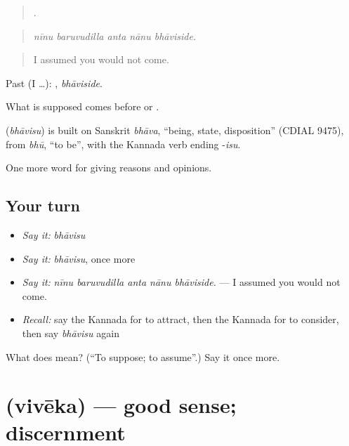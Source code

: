 \begin{quote}
    .
\end{quote}

\begin{quote}
\emph{nīnu baruvudilla anta nānu bhāviside.}
\end{quote}

\begin{quote}
I assumed you would not come.
\end{quote}

Past (I …): , \emph{bhāviside}.

What is supposed comes before  or .

\begin{cousinweb}
\textbf{} (\emph{bhāvisu}) is built on Sanskrit \emph{bhāva}, \textquotedblleft{}being, state, disposition\textquotedblright{} (CDIAL 9475), from \emph{bhū}, \textquotedblleft{}to be\textquotedblright{}, with the Kannada verb ending -\emph{isu}.
\end{cousinweb}

\begin{grammarlens}[title={What you've built}]
One more word for giving reasons and opinions.
\end{grammarlens}

\subsection*{Your turn}
\begin{itemize}
\raggedright
  \item \emph{Say it:} \emph{bhāvisu}
  \item \emph{Say it:} \emph{bhāvisu}, once more
  \item \emph{Say it:} \emph{nīnu baruvudilla anta nānu bhāviside.} — I assumed you would not come.
  \item \emph{Recall:} say the Kannada for to attract, then the Kannada for to consider, then say \emph{bhāvisu} again
\end{itemize}

\begin{tcolorbox}[breakable,colback=teal!4,colframe=teal!35!black,title={Before you move on}]
What does  mean? (\textquotedblleft{}To suppose; to assume\textquotedblright{}.) Say it once more.
\end{tcolorbox}
\section[\texorpdfstring{\kn{ವಿವೇಕ} (vivēka)}{ವಿವೇಕ (vivēka)}]{ (vivēka) — good sense; discernment}

